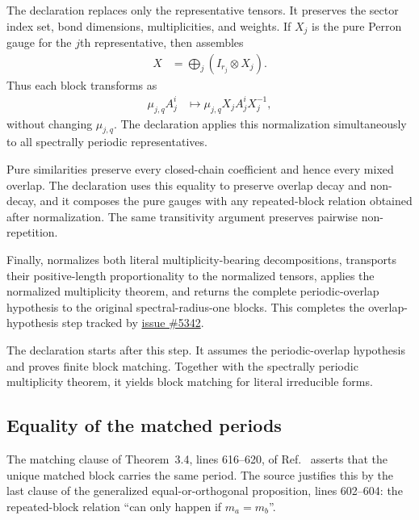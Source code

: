 \documentclass{article}
\begin{document}
The declaration  replaces only the
representative tensors. It preserves the sector index set, bond dimensions,
multiplicities, and weights. If $X_j$ is the pure Perron gauge for the $j$th
representative, then
 assembles
\begin{align}
    X
    &=\bigoplus_j(I_{r_j}\otimes X_j).
    \label{eq:dccsp17_periodic_overlap_route_alignment_sectorwise_gauge}
\end{align}
Thus each block transforms as
\begin{align}
    \mu_{j,q}A_j^i
    &\longmapsto
      \mu_{j,q}X_jA_j^iX_j^{-1},
    \label{eq:dccsp17_periodic_overlap_route_alignment_weight_preservation}
\end{align}
without changing $\mu_{j,q}$. The declaration
 applies this
normalization simultaneously to all spectrally periodic representatives.

Pure similarities preserve every closed-chain coefficient and hence every
mixed overlap. The declaration
 uses this equality to preserve
overlap decay and non-decay, and it composes the pure gauges with any
repeated-block relation obtained after normalization. The same transitivity
argument preserves pairwise non-repetition.

Finally,
normalizes both literal multiplicity-bearing decompositions, transports their
positive-length proportionality to the normalized tensors, applies the
normalized multiplicity theorem, and returns the complete periodic-overlap
hypothesis to the original spectral-radius-one blocks. This completes the
overlap-hypothesis step tracked by
\href{https://github.com/LionSR/TNLean/issues/5342}{issue \#5342}.

The declaration 
starts after this step. It assumes the periodic-overlap hypothesis and proves
finite block matching. Together with the spectrally periodic multiplicity
theorem, it yields block matching for literal irreducible forms.

\subsection{Equality of the matched periods}

The matching clause of Theorem~3.4, lines 616--620, of
Ref.~\cite{DeLasCuevas2017Irreducible} asserts that the unique matched block
carries the same period. The source justifies this by the last clause of the
generalized equal-or-orthogonal proposition, lines 602--604: the repeated-block
relation ``can only happen if $m_a=m_b$''.
\end{document}
